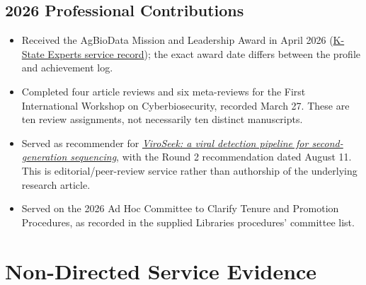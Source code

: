 \subsection*{2026 Professional Contributions}
\begin{itemize}
  \item Received the AgBioData Mission and Leadership Award in April 2026 (\href{https://experts.ksu.edu/david.molik/professional}{K-State Experts service record}); the exact award date differs between the profile and achievement log.
  \item Completed four article reviews and six meta-reviews for the First International Workshop on Cyberbiosecurity, recorded March 27. These are ten review assignments, not necessarily ten distinct manuscripts.
  \item Served as recommender for \href{https://doi.org/10.24072/pci.genomics.100695}{\textit{ViroSeek: a viral detection pipeline for second-generation sequencing}}, with the Round 2 recommendation dated August 11. This is editorial/peer-review service rather than authorship of the underlying research article.
  \item Served on the 2026 Ad Hoc Committee to Clarify Tenure and Promotion Procedures, as recorded in the supplied Libraries procedures' committee list.
\end{itemize}

\section{Non-Directed Service Evidence}
\printbibliography[keyword={nondirected},heading=none]
